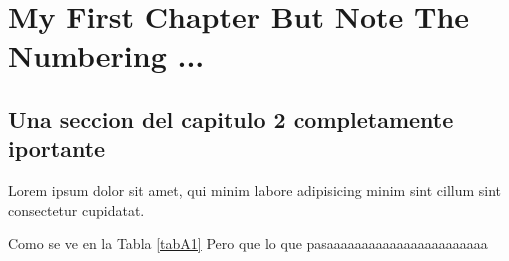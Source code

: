 \chapter{My First Chapter But Note The Numbering ...}
\label{chap2}
\ifpdf
    \graphicspath{{Chapter1/Chapter1Figs/PNG/}{Chapter1/Chapter1Figs/PDF/}{Chapter1/Chapter1Figs/}}
\else
    \graphicspath{{Chapter1/Chapter1Figs/EPS/}{Chapter1/Chapter1Figs/}}
\fi

\section{Una seccion del capitulo 2 completamente iportante}	

Lorem ipsum dolor sit amet, qui minim labore adipisicing minim sint cillum sint consectetur cupidatat. \cite{miticagenda}  

Como se ve en la Tabla \ref{tabA1}
Pero que lo que pasaaaaaaaaaaaaaaaaaaaaaaa
